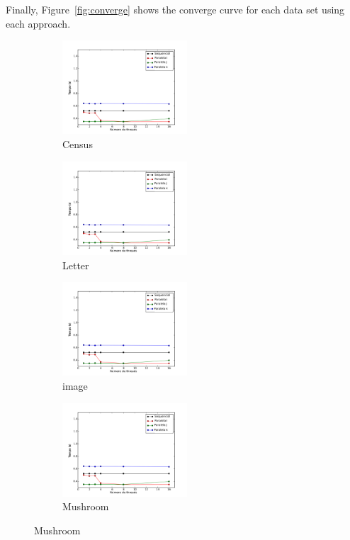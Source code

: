 	Finally, Figure~\ref{fig:converge} shows the converge curve for each data set using each approach.
	\begin{figure}[H]
		\centering
		\begin{subfigure}{.3\textwidth}
			\centering
			\includegraphics[height=3.5cm]{images/census}
			\caption{Census}
			\label{fig:census}
		\end{subfigure}
		\begin{subfigure}{.3\textwidth}
			\centering
			\includegraphics[height=3.5cm]{images/letter}
			\caption{Letter}
			\label{fig:letter}
		\end{subfigure}
		\begin{subfigure}{.3\textwidth}
			\centering
			\includegraphics[height=3.5cm]{images/image}
			\caption{image}
			\label{fig:image}
		\end{subfigure}
		\begin{subfigure}{.3\textwidth}
			\centering
			\includegraphics[height=3.5cm]{images/mushroom}
			\caption{Mushroom}
			\label{fig:mushroom}
		\end{subfigure}

\end{figure}
